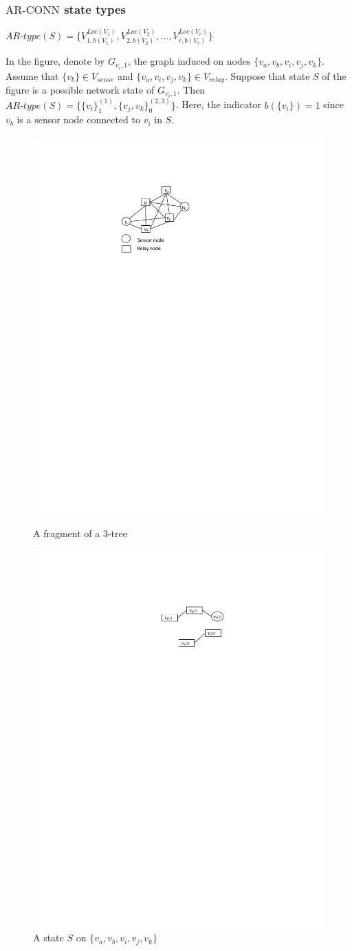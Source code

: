 \documentclass{beamer}
\newcommand{\ARCONN}   { {\mathrm {AR\mbox{-}CONN}} }
\newcommand {\nwline} {\hfill\break}
\begin{document}
\begin{frame}
\frametitle{$\ARCONN$ state types}

\centerline{
$AR\mbox{-}type(S)=\{V_{1,b(V_1)}^{Loc(V_1)}, V_{2,b(V_2)}^{Loc(V_2)}, \ldots, V^{Loc(V_r)}_{r,b(V_r)} \}$}
\begin{example}
\normalfont
In the figure, denote by $G_{v_i,1}$, the graph induced on nodes $\{v_a,v_b,v_i,v_j,v_k\}$. Assume that $\{v_b\}\in V_{sense}$ and $\{v_a,v_i,v_j,v_k\} \in V_{relay}$. Suppose that state $S$ of the figure is a possible network state of $G_{v_i,1}$. Then $AR\mbox{-}type(S)=\big \{\{v_i\}_1^{(1)},\{v_j,v_k\}_0^{(2,3)}\big\}$. Here, the indicator $b(\{v_i\})=1$ since $v_b$ is a sensor node connected to $v_i$ in $S$. 
\end{example}

\begin{figure}[!htb]
\begin{minipage}[]{0.45\linewidth}
\includegraphics[width=1.5 in, height=1 in]{Ch5f2.pdf}
\caption{A fragment of a 3-tree}
\label{fig:sttype1}
\end{minipage}
\begin{minipage}{0.45\linewidth}
\nwline
\includegraphics[width=1.2 in, height=1 in]{Ch5f2_1.pdf}
\caption{A state $S$ on $\{v_a,v_b,v_i,v_j,v_k\}$}
\label{fig:sttype1_node}
\end{minipage}
\end{figure}
\end{frame}
\end{document}
